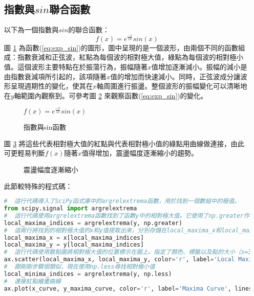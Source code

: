 \documentclass[12pt, a4paper]{article}
\begin{document}
\subsection{指數與$sin$聯合函數}
以下為一個指數與$sin$的聯合函數：
\begin{equation}\label{eq:exp_sin}
f(x)={e^{\frac{-x}{10}}} sin(x)
\end{equation}
圖 \ref{fig:exp_sin_1} 為函數(\ref{eq:exp_sin})的圖形，圖中呈現的是一個波形，由兩個不同的函數組成：指數衰減和正弦波，紅點為每個波的相對極大值，綠點為每個波的相對極小值。這個波形主要特點在於振蕩行為，振幅隨著$x$值增加逐漸減小。振幅的減小是由指數衰減項所引起的，該項隨著$x$值的增加而快速減小。同時，正弦波成分讓波形呈現週期性的變化，使其在$x$軸周圍進行振盪。整個波形的振幅變化可以清晰地在$y$軸範圍內觀察到。可參考圖 \ref{fig:exp_sin_2} 來觀察函數(\ref{eq:exp_sin})的變化。
\begin{figure}[H]
    \caption{$f(x) = {e^{\frac{-x}{10}}} sin(x)$}
    \label{fig:exp_sin_1}
\end{figure}
\begin{figure}[H]
    \centering
    \caption{指數與sin函數}
    \label{fig:exp_sin_2}
\end{figure}
\newpage
圖 \ref{fig:exp_sin_3} 將這些代表相對極大值的紅點與代表相對極小值的綠點用曲線做連接，由此可更輕易判斷$f(x)$隨著$x$值得增加，震盪幅度逐漸縮小的趨勢。
\begin{figure}[H]
    \caption{震盪幅度逐漸縮小}
    \label{fig:exp_sin_3}
\end{figure}
此節較特殊的程式碼：
\begin{lstlisting}[language=Python]
#  這行代碼導入了SciPy函式庫中的argrelextrema函數，用於找到一個數組中的極值。
from scipy.signal import argrelextrema
#  這行代碼使用argrelextrema函數找到了函數y中的相對極大值。它使用了np.greater作為比較函數，以確定哪些值被視為極大值。
local_maxima_indices = argrelextrema(y, np.greater)
#  這兩行將找到的相對極大值的x和y值提取出來，分別存儲在local_maxima_x和local_maxima_y中。
local_maxima_x = x[local_maxima_indices]
local_maxima_y = y[local_maxima_indices]
#  這行代碼使用散點圖將相對極大值的位置標示在圖上。指定了顏色、標籤以及點的大小（s=30）。zorder參數用於指定圖層順序，確保這些點在圖形的最上層。
ax.scatter(local_maxima_x, local_maxima_y, color='r', label='Local Maxima', s=30, zorder=2)
#  跟剛剛步驟很類似，現在使用np.less尋找相對極小值
local_minima_indices = argrelextrema(y, np.less)
#  連接紅點繪畫曲線
ax.plot(x_curve, y_maxima_curve, color='r', label='Maxima Curve', linestyle='-', linewidth=2)
\end{lstlisting}
\end{document}
